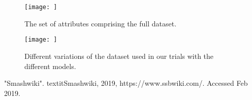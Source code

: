 \documentclass{article}
\begin{document}
\appendix

\begin{figure}[!htb]
    \centering
    \texttt{[image: ]}
    \caption{The set of attributes comprising the full dataset.}
    \label{fig:my_label}
\end{figure}

\begin{figure}[!htb]
    \centering
    \texttt{[image: ]}
    \caption{Different variations of the dataset used in our trials with the different models.}
    \label{fig:my_label}
\end{figure}


\begin{thebibliography}{1}
"Smashwiki". textit{Smashwiki}, 2019, https://www.ssbwiki.com/. Accessed Feb 2019.
\end{thebibliography}
\end{document}
